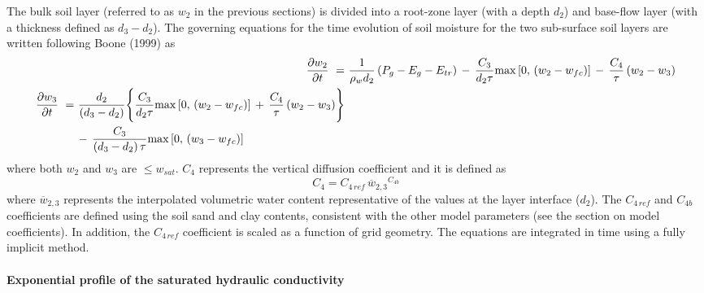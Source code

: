 The bulk soil layer (referred to as $w_2$ in the previous sections)
is divided into a root-zone layer (with a depth $d_2$) and base-flow layer
(with a thickness defined as $d_3-d_2$).
The governing equations for the time evolution of
soil moisture for the two sub-surface soil layers are written
following Boone \etal (1999)\nocite{Boone1999} as
%
\begin{align}
%
\frac{\partial w_2}{\partial t} \,\, =& \,\,
\frac{1}{ \rho_w d_2}\left(P_g-E_g-E_{tr}\right)
\,-\, \frac{C_3}{ d_2\tau} {\rm max}\left[0,\,\left(w_2-w_{fc}\right)\right]
\,-\, \frac{C_4}{\tau} \left(w_2-w_3\right) 
\\
%
\begin{split}
%
\frac{\partial w_3}{\partial t} \,\, =& \,\,
\frac{d_2}{ \left(d_3-d_2\right)}
\Biggr\lbrace
\frac{C_3}{ d_2\tau} {\rm max}\left[0,\,\left(w_2-w_{fc}\right)\right]
\,+\, \frac{C_4}{\tau} \left(w_2-w_3\right)
\Biggr\rbrace 
\\
& \,-\,
\frac{C_3}{ \left(d_3-d_2\right)\tau}
{\rm max}\left[0,\,\left(w_3-w_{fc}\right)\right] \,
%
\end{split}
%
\end{align}
%
where both $w_2$ and $w_3$ are $\leq w_{sat}$.
$C_4$ represents the vertical diffusion coefficient and
it is defined as
%
\begin{equation}
%
C_4 = {C_{4\, ref}} \,{{\overline w}_{2,3}}^{C_{4b}} 
%
\end{equation}
%
where ${\overline w_{2,3}}$ represents the interpolated volumetric water
content representative of the values at the layer interface ($d_2$).
The $C_{4\, ref}$ and $C_{4b}$ coefficients are defined using the soil
sand and clay contents, consistent with the
other model parameters (see the section on model coefficients). In addition,
the $C_{4\, ref}$ coefficient is scaled as a function of grid geometry.
The equations are integrated in time using a fully implicit method.

\paragraph{Exponential profile of the saturated hydraulic conductivity}

